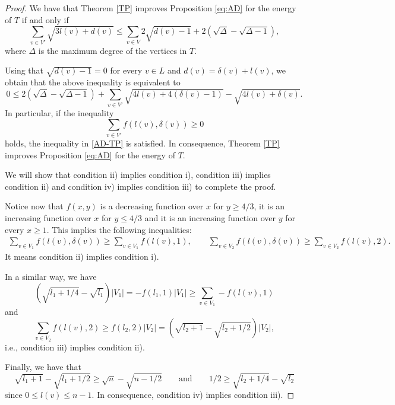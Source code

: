 \documentclass[a4paper]{article}
\newcommand{\abs}[1]{\left\lvert#1\right\rvert}
\theoremstyle{plain}
\begin{document}
\begin{proof}
    We have that Theorem \ref{TP} improves Proposition \ref{eq:AD} for the energy of \(T\) if and only if
    \[
        \sum_{v \in V'} \sqrt{3l(v) + d(v)} \leq \sum_{v \in V} 2\sqrt{d(v) - 1} + 2\left(\sqrt{\Delta} - \sqrt{\Delta - 1}\right),
    \]
    where \(\Delta\) is the maximum degree of the vertices in \(T\).
    
    Using that \(\sqrt{d(v) - 1} = 0\) for every \(v \in L\) and \(d(v) = \delta(v) + l(v)\), we obtain that the above inequality is equivalent to
    \begin{equation}\label{AD-TP}
        0 \leq 2\left(\sqrt{\Delta} - \sqrt{\Delta - 1}\right) + \sum_{v \in V'} \sqrt{4l(v) + 4(\delta(v) - 1)} - \sqrt{4l(v) + \delta(v)}.
    \end{equation}
    In particular, if the inequality
    \[
        \sum_{v \in V'} f(l(v),\delta(v)) \geq 0
    \]
    holds, the inequality in \eqref{AD-TP} is satisfied. In consequence, Theorem \ref{TP} improves Proposition \ref{eq:AD} for the energy of \(T\).

    We will show that condition ii) implies condition i), condition iii) implies condition ii) and condition iv) implies condition iii) to complete the proof.
    
    Notice now that \(f(x,y)\) is a decreasing function over \(x\) for \(y \geq 4/3\), it is an increasing function over \(x\) for \(y \leq 4/3\) and it is an increasing function over \(y\) for every \(x \geq 1\). This implies the following inequalities:
    \begin{align*}
        \sum_{v \in V_1} f(l(v),\delta(v)) \geq \sum_{v \in V_1} f(l(v),1), \qquad \sum_{v \in V_2} f(l(v),\delta(v)) \geq \sum_{v \in V_2} f(l(v),2).
    \end{align*}
    It means condition ii) implies condition i).

    In a similar way, we have
    \[
        \left(\sqrt{l_1 + 1/4} - \sqrt{l_1}\right)\abs{V_1} = -f(l_1,1)\abs{V_1} \geq \sum_{v \in V_1} -f(l(v),1)
    \]
    and
    \[
         \sum_{v \in V_2} f(l(v),2) \geq f(l_2, 2)\abs{V_2} = \left(\sqrt{l_2 + 1} - \sqrt{l_2 + 1/2}\right)\abs{V_2},
    \]
    i.e., condition iii) implies condition ii).

    Finally, we have that
    \[
        \sqrt{l_1 + 1} - \sqrt{l_1 + 1/2} \geq \sqrt{n} - \sqrt{n-1/2} \qquad \mbox{and} \qquad 1/2 \geq \sqrt{l_2 + 1/4} - \sqrt{l_2}
    \]
    since \(0 \leq l(v) \leq n-1\). In consequence, condition iv) implies condition iii).
    
\end{proof}
\end{document}
